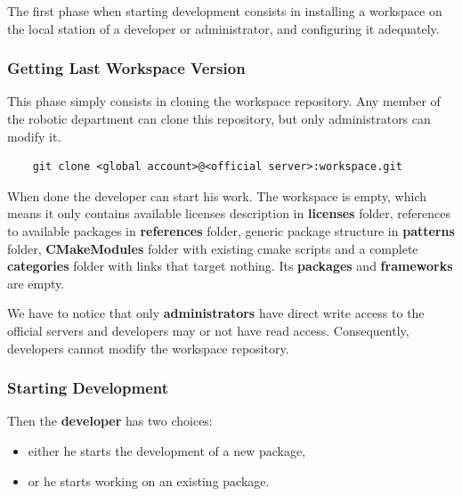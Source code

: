 \documentclass[12pt,a4paper]{article}
\begin{document}
The first phase when starting development consists in installing a workspace on the local  station of a developer or administrator, and configuring it adequately.

\subsubsection{Getting Last Workspace Version}

This phase simply consists in cloning the workspace repository. Any member of the robotic department can clone this repository, but only administrators can  modify it.

\begin{verbatim}
	git clone <global account>@<official server>:workspace.git
\end{verbatim}

When done the developer can start his work. The workspace is empty, which means it only contains available licenses description in \textbf{licenses} folder, references to available packages in \textbf{references} folder, generic package structure in \textbf{patterns} folder, \textbf{CMakeModules} folder with existing cmake scripts and a complete \textbf{categories} folder with links that target nothing. Its \textbf{packages} and \textbf{frameworks} are empty.

We have to notice that only \textbf{administrators} have direct write access to the official servers and developers may or not have read access. Consequently, developers cannot modify the workspace repository.
 
\subsubsection{Starting Development}

Then the \textbf{developer} has two choices:
\begin{itemize}
\item either he starts the development of a new package,
\item or he starts working on an existing package.
\end{itemize}
\end{document}
